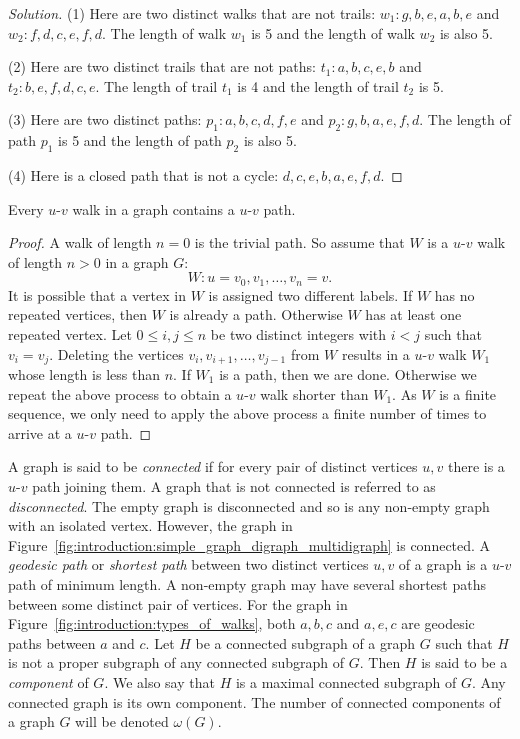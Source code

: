 \begin{proof}[Solution]
(1) Here are two distinct walks that are not trails:
$w_1: g, b, e, a, b, e$ and $w_2: f, d, c, e, f, d$. The length of
walk $w_1$ is 5 and the length of walk $w_2$ is also 5.

(2) Here are two distinct trails that are not paths:
$t_1: a,b,c,e,b$ and $t_2: b,e,f,d,c,e$. The length of trail $t_1$ is
4 and the length of trail $t_2$ is 5.

(3) Here are two distinct paths: $p_1: a, b, c, d, f, e$ and
$p_2: g, b, a, e, f, d$. The length of path $p_1$ is 5 and the length
of path $p_2$ is also 5.

(4) Here is a closed path that is not a cycle: $d, c, e, b, a, e, f, d$.
\end{proof}

\begin{theorem}
\label{thm:introduction:every_walk_has_a_path}
Every $u$-$v$ walk in a graph contains a $u$-$v$ path.
\end{theorem}

\begin{proof}
A walk of length $n = 0$ is the trivial path. So assume that $W$ is a
$u$-$v$ walk of length $n > 0$ in a graph $G$:
\[
W: u = v_0, v_1, \dots, v_n = v.
\]
It is possible that a vertex in $W$ is assigned two different
labels. If $W$ has no repeated vertices, then $W$ is already a
path. Otherwise $W$ has at least one repeated vertex. Let
$0 \leq i,j \leq n$ be two distinct integers with $i < j$ such that
$v_i = v_j$. Deleting the vertices $v_i, v_{i+1}, \dots, v_{j-1}$ from
$W$ results in a $u$-$v$ walk $W_1$ whose length is less than $n$. If
$W_1$ is a path, then we are done. Otherwise we repeat the above
process to obtain a $u$-$v$ walk shorter than $W_1$. As $W$ is a
finite sequence, we only need to apply the above process a finite
number of times to arrive at a $u$-$v$ path.
\end{proof}

A graph is said to be \emph{connected} if for every pair of distinct
vertices $u, v$ there is a $u$-$v$ path joining them. A graph that is
not connected is referred to as \emph{disconnected}. The empty graph
is disconnected and so is any non-empty graph with an isolated
vertex. However, the graph in
Figure~\ref{fig:introduction:simple_graph_digraph_multidigraph} is
connected. A \emph{geodesic path} or \emph{shortest path} between two
distinct vertices $u,v$ of a graph is a $u$-$v$ path of minimum
length. A non-empty graph may have several shortest paths between some
distinct pair of vertices. For the graph in
Figure~\ref{fig:introduction:types_of_walks}, both $a,b,c$ and $a,e,c$
are geodesic paths between $a$ and $c$. Let $H$ be a connected
subgraph of a graph $G$ such that $H$ is not a proper subgraph of any
connected subgraph of $G$. Then $H$ is said to be a
\emph{component} of $G$. We also say that $H$ is a
maximal connected subgraph of $G$. Any connected graph is its own
component. The number of connected
components of a graph $G$ will be denoted $\omega(G)$.
\index{$\omega$}

